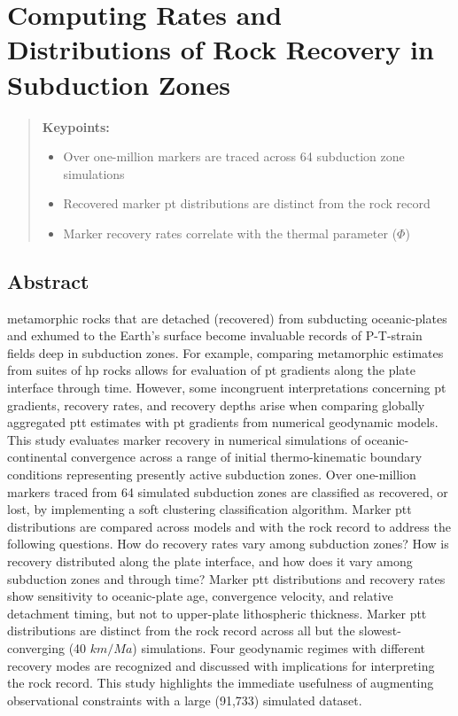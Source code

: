 \cleardoublepage

\hypertarget{chpt4}{%
\chapter{Computing Rates and Distributions of Rock Recovery in Subduction Zones}\label{chpt4}}


\begin{quote}
\textbf{Keypoints:}

\begin{itemize}
\item
  Over one-million markers are traced across 64 subduction zone simulations
\item
  Recovered marker \gls{pt} distributions are distinct from the rock record
\item
  Marker recovery rates correlate with the thermal parameter (\(\Phi\))
\end{itemize}
\end{quote}

\hypertarget{chpt4Abstract}{%
\section{Abstract}\label{chpt4Abstract}}

 metamorphic rocks that are detached (recovered) from subducting oceanic-plates and exhumed to the Earth's surface become invaluable records of P-T-strain fields deep in subduction zones. For example, comparing metamorphic  estimates from suites of \gls{hp} rocks allows for evaluation of \gls{pt} gradients along the plate interface through time. However, some incongruent interpretations concerning \gls{pt} gradients, recovery rates, and recovery depths arise when comparing globally aggregated \gls{ptt} estimates with \gls{pt} gradients from numerical geodynamic models. This study evaluates marker recovery in numerical simulations of oceanic-continental convergence across a range of initial thermo-kinematic boundary conditions representing presently active subduction zones. Over one-million markers traced from 64 simulated subduction zones are classified as recovered, or lost, by implementing a soft clustering classification algorithm. Marker \gls{ptt} distributions are compared across models and with the rock record to address the following questions. How do recovery rates vary among subduction zones? How is recovery distributed along the plate interface, and how does it vary among subduction zones and through time? Marker \gls{ptt} distributions and recovery rates show sensitivity to oceanic-plate age, convergence velocity, and relative detachment timing, but not to upper-plate lithospheric thickness. Marker \gls{ptt} distributions are distinct from the rock record across all but the slowest-converging (40 \(km/Ma\)) simulations. Four geodynamic regimes with different recovery modes are recognized and discussed with implications for interpreting the rock record. This study highlights the immediate usefulness of augmenting observational constraints with a large (91,733) simulated dataset.

